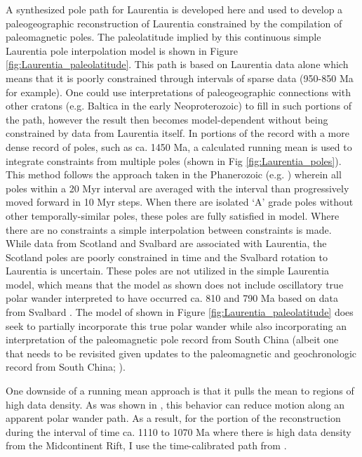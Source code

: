 \documentclass[twocolumn, switch]{article} %
\begin{document}
A synthesized pole path for Laurentia is developed here and used to develop a paleogeographic reconstruction of Laurentia constrained by the compilation of paleomagnetic poles. The paleolatitude implied by this continuous simple Laurentia pole interpolation model is shown in Figure \ref{fig:Laurentia_paleolatitude}. This path is based on Laurentia data alone which means that it is poorly constrained through intervals of sparse data (950-850 Ma for example). One could use interpretations of paleogeographic connections with other cratons (e.g. Baltica in the early Neoproterozoic) to fill in such portions of the path, however the result then becomes model-dependent without being constrained by data from Laurentia itself. In portions of the record with a more dense record of poles, such as ca. 1450 Ma, a calculated running mean is used to integrate constraints from multiple poles (shown in Fig \ref{fig:Laurentia_poles}). This method follows the approach taken in the Phanerozoic (e.g. \citealp{Torsvik2012a}) wherein all poles within a 20 Myr interval are averaged with the interval than progressively moved forward in 10 Myr steps. When there are isolated `A' grade poles without other temporally-similar poles, these poles are fully satisfied in model. Where there are no constraints a simple interpolation between constraints is made. While data from Scotland and Svalbard are associated with Laurentia, the Scotland poles are poorly constrained in time and the Svalbard rotation to Laurentia is uncertain. These poles are not utilized in the simple Laurentia model, which means that the model as shown does not include oscillatory true polar wander interpreted to have occurred ca. 810 and 790 Ma based on data from Svalbard \citep{Maloof2006a}. The model of \cite{Li2013a} shown in Figure \ref{fig:Laurentia_paleolatitude} does seek to partially incorporate this true polar wander while also incorporating an interpretation of the paleomagnetic pole record from South China (albeit one that needs to be revisited given updates to the paleomagnetic and geochronologic record from South China; \citealp{Zhang2021a}).

One downside of a running mean approach is that it pulls the mean to regions of high data density. As was shown in \cite{Swanson-Hysell2019a}, this behavior can reduce motion along an apparent polar wander path. As a result, for the portion of the reconstruction during the interval of time ca. 1110 to 1070 Ma where there is high data density from the Midcontinent Rift, I use the time-calibrated path from \cite{Swanson-Hysell2019a}.
\end{document}
